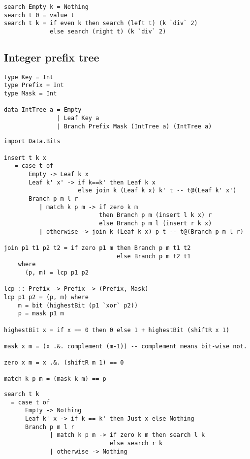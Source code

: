 \documentclass{article}
\begin{document}
\lstset{language=Haskell}
\begin{lstlisting}[caption=Integer trie look up]
search Empty k = Nothing
search t 0 = value t
search t k = if even k then search (left t) (k `div` 2)
             else search (right t) (k `div` 2)
\end{lstlisting}

\subsection{Integer prefix tree}

\lstset{language=Haskell}
\begin{lstlisting}[caption=Integer prefix tree definition]
type Key = Int
type Prefix = Int
type Mask = Int

data IntTree a = Empty
               | Leaf Key a
               | Branch Prefix Mask (IntTree a) (IntTree a)
\end{lstlisting}

\lstset{language=Haskell}
\begin{lstlisting}[caption=Integer prefix tree insertion.]
import Data.Bits

insert t k x
   = case t of
       Empty -> Leaf k x
       Leaf k' x' -> if k==k' then Leaf k x
                     else join k (Leaf k x) k' t -- t@(Leaf k' x')
       Branch p m l r
          | match k p m -> if zero k m
                           then Branch p m (insert l k x) r
                           else Branch p m l (insert r k x)
          | otherwise -> join k (Leaf k x) p t -- t@(Branch p m l r)

join p1 t1 p2 t2 = if zero p1 m then Branch p m t1 t2
                                else Branch p m t2 t1
    where
      (p, m) = lcp p1 p2

lcp :: Prefix -> Prefix -> (Prefix, Mask)
lcp p1 p2 = (p, m) where
    m = bit (highestBit (p1 `xor` p2))
    p = mask p1 m

highestBit x = if x == 0 then 0 else 1 + highestBit (shiftR x 1)

mask x m = (x .&. complement (m-1)) -- complement means bit-wise not.

zero x m = x .&. (shiftR m 1) == 0

match k p m = (mask k m) == p
\end{lstlisting}

\lstset{language=Haskell}
\begin{lstlisting}[caption=Lookup the integer prefix tree]
search t k
  = case t of
      Empty -> Nothing
      Leaf k' x -> if k == k' then Just x else Nothing
      Branch p m l r
             | match k p m -> if zero k m then search l k
                              else search r k
             | otherwise -> Nothing
\end{lstlisting}
\end{document}
